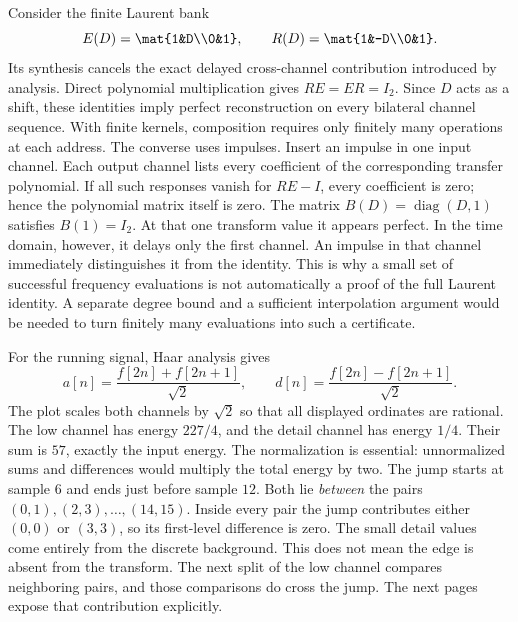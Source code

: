 Consider the finite Laurent bank
\[
E(D)=\mat{1&D\\0&1},\qquad
R(D)=\mat{1&-D\\0&1}.
\]
Its synthesis cancels the exact delayed cross-channel contribution introduced by analysis.
Direct polynomial multiplication gives $RE=ER=I_2$. Since $D$ acts as a shift, these identities imply perfect reconstruction on every bilateral channel sequence. With finite kernels, composition requires only finitely many operations at each address.
The converse uses impulses. Insert an impulse in one input channel. Each output channel lists every coefficient of the corresponding transfer polynomial. If all such responses vanish for $RE-I$, every coefficient is zero; hence the polynomial matrix itself is zero.
The matrix $B(D)=\operatorname{diag}(D,1)$ satisfies $B(1)=I_2$. At that one transform value it appears perfect. In the time domain, however, it delays only the first channel. An impulse in that channel immediately distinguishes it from the identity.
This is why a small set of successful frequency evaluations is not automatically a proof of the full Laurent identity. A separate degree bound and a sufficient interpolation argument would be needed to turn finitely many evaluations into such a certificate.

For the running signal, Haar analysis gives
\[
a[n]=\frac{f[2n]+f[2n+1]}{\sqrt2},\qquad
d[n]=\frac{f[2n]-f[2n+1]}{\sqrt2}.
\]
The plot scales both channels by $\sqrt2$ so that all displayed ordinates are rational.
The low channel has energy $227/4$, and the detail channel has energy $1/4$. Their sum is $57$, exactly the input energy. The normalization is essential: unnormalized sums and differences would multiply the total energy by two.
The jump starts at sample $6$ and ends just before sample $12$. Both lie \emph{between} the pairs $(0,1),(2,3),\ldots,(14,15)$. Inside every pair the jump contributes either $(0,0)$ or $(3,3)$, so its first-level difference is zero. The small detail values come entirely from the discrete background.
This does not mean the edge is absent from the transform. The next split of the low channel compares neighboring pairs, and those comparisons do cross the jump. The next pages expose that contribution explicitly.

